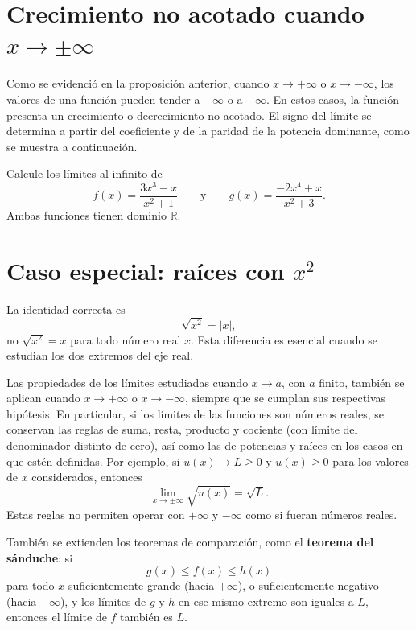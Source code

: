 \documentclass[10pt,a5paper]{article}
\newif\ifmostrarSoluciones
\begin{document}
\section*{Crecimiento no acotado cuando $x\to\pm\infty$}

Como se evidenció en la proposición anterior, cuando $x\to+\infty$ o $x\to-\infty$, los valores de una función pueden tender a $+\infty$ o a $-\infty$. En estos casos, la función presenta un crecimiento o decrecimiento no acotado. El signo del límite se determina a partir del coeficiente y de la paridad de la potencia dominante, como se muestra a continuación.

\begin{ejemplo}
Calcule los límites al infinito de
\[
  f(x)=\frac{3x^3-x}{x^2+1}
  \qquad\text{y}\qquad
  g(x)=\frac{-2x^4+x}{x^2+3}.
\]
Ambas funciones tienen dominio $\mathbb{R}$.
\end{ejemplo}
\ifmostrarSoluciones
\begin{solucion}
La función $f$ se comporta como $3x$. Como la potencia dominante es impar y su coeficiente es positivo,
\[
  \lim_{x\to+\infty}f(x)=+\infty,
  \qquad
  \lim_{x\to-\infty}f(x)=-\infty.
\]
La función $g$ se comporta como $-2x^2$. La potencia dominante es par, por lo que $x^2$ es positivo en ambos extremos; el coeficiente negativo determina el signo final:
\[
  \lim_{x\to+\infty}g(x)=-\infty,
  \qquad
  \lim_{x\to-\infty}g(x)=-\infty.
\]
Ninguna de las dos funciones tiene asíntota horizontal.
\end{solucion}
\else\vspace{22mm}\fi

\section*{Caso especial: raíces con $x^2$}

La identidad correcta es
\[
  \sqrt{x^2}=|x|,
\]
no $\sqrt{x^2}=x$ para todo número real $x$. Esta diferencia es esencial cuando se estudian los dos extremos del eje real.

\begin{nota}
Las propiedades de los límites estudiadas cuando $x\to a$, con $a$ finito, también se aplican cuando $x\to+\infty$ o $x\to-\infty$, siempre que se cumplan sus respectivas hipótesis. En particular, si los límites de las funciones son números reales, se conservan las reglas de suma, resta, producto y cociente (con límite del denominador distinto de cero), así como las de potencias y raíces en los casos en que estén definidas. Por ejemplo, si $u(x)\to L\geq0$ y $u(x)\geq0$ para los valores de $x$ considerados, entonces
\[
  \lim_{x\to\pm\infty}\sqrt{u(x)}=\sqrt{L}.
\]
Estas reglas no permiten operar con $+\infty$ y $-\infty$ como si fueran números reales.

También se extienden los teoremas de comparación, como el \textbf{teorema del sánduche}: si
\[
  g(x)\leq f(x)\leq h(x)
\]
para todo $x$ suficientemente grande (hacia $+\infty$), o suficientemente negativo (hacia $-\infty$), y los límites de $g$ y $h$ en ese mismo extremo son iguales a $L$, entonces el límite de $f$ también es $L$.
\end{nota}
\end{document}
